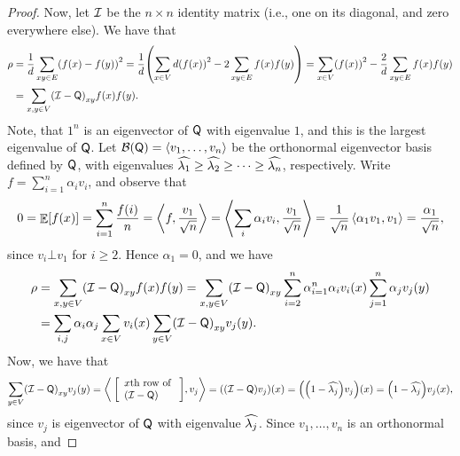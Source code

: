 \begin{proof}
    Now, let $\mathcal{I}$ be the $n\times n$ identity matrix (i.e., one on
    its diagonal, and zero everywhere else). We have that
    \begin{align*}
        \rho & 
        = \frac{1}{d} \sum_{xy \in E}\pth{ f(x) -f(y) }^2
        =
        \frac{1}{d} \pth{ \sum_{x\in V} d \pth{f(x)}^2 -
           2\sum_{xy \in E}f(x) f(y) }
        =
        \sum_{x\in V} \pth{f(x)}^2 - \frac{2}{d} \sum_{xy \in E}f(x)
        f(y) 
        \\        &
        =
        \sum_{x,y \in V} \pth{\IMtrx - \TMtrx}_{xy} f(x) f(y).
    \end{align*}
    Note, that $1^n$ is an eigenvector of $\mathsf{Q}$ with eigenvalue
    $1$, and this is the largest eigenvalue of $\mathsf{Q}$.  Let
    $\mathcal{B}(\mathsf{Q})= \left\langle {v_1,\ldots, v_n} \right\rangle$ be the orthonormal
    eigenvector basis defined by $\mathsf{Q}$, with eigenvalues $\widehat{\lambda_{1}}
    \geq \widehat{\lambda_{2}} \geq \cdots \geq \widehat{\lambda_{n}}$, respectively.  Write
    $f=\sum_{i=1}^n \alpha_i v_i$, and observe that
    \[
    0 = \mathop{\mathbb{E}}\!\left[ {f(x)} \right] = \sum_{i=1}^n \frac{f(i)}{n} =
    \left\langle {{f},{\frac{v_1}{\sqrt{n}}}} \right\rangle =
    \left\langle {{\sum_i \alpha_i v_i},{\frac{v_1}{\sqrt{n}}}} \right\rangle =
    \frac{1}{\sqrt{n}} \left\langle {{\alpha_1v_1},{v_1}} \right\rangle =
    \frac{\alpha_1}{\sqrt{n}},
    \]
    since $v_i \bot v_1$ for $i \geq 2$. Hence $\alpha_1=0$, and we
    have
    \begin{align*}
        \rho &=  \sum_{x,y \in V} \pth{\IMtrx - \TMtrx}_{xy} f(x) f(y)
         = \sum_{x,y \in V} \pth{\IMtrx - \TMtrx}_{xy}\sum_{i=2}^n
        \alpha_{i=1}^n \alpha_i v_i (x) \sum_{j=1}^n \alpha_j v_j(y)\\
        &%
        =%
        \sum_{i,j} \alpha_i \alpha_j \sum_{x \in V} v_i(x) \sum_{y \in
           V} \pth{\IMtrx - \TMtrx}_{xy} v_j(y).
    \end{align*}
    Now, we have that
    \begin{align*}
        \sum_{y \in V} \pth{\IMtrx - \TMtrx}_{xy} v_j(y) =
        \DotProd{\;\;\pbrc{\begin{array}{l}
                  x\text{th row of }\\
                  \pth{\IMtrx - \TMtrx}
               \end{array}}}{v_j}
        =%
        \pth{\MakeBig
           \pth{\IMtrx - \TMtrx} v_j} ({x})
        =%
        \pth{
           \pth{1- \TEV{j}} v_j}(x) =      
           \pth{1- \TEV{j}} v_j(x),
    \end{align*}
    since $v_j$ is eigenvector of $\mathsf{Q}$ with eigenvalue $\widehat{\lambda_{j}}$.
    Since $v_1,\ldots, v_n$ is an orthonormal basis, and

\end{proof}

